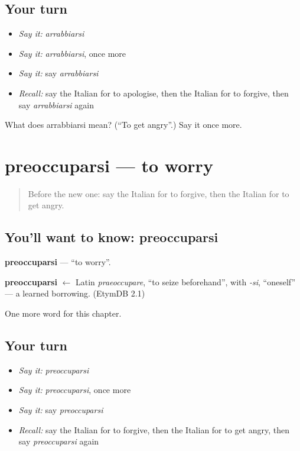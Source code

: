 \subsection*{Your turn}
\begin{itemize}
\raggedright
  \item \emph{Say it:} \emph{arrabbiarsi}
  \item \emph{Say it:} \emph{arrabbiarsi}, once more
  \item \emph{Say it:} say \emph{arrabbiarsi}
  \item \emph{Recall:} say the Italian for to apologise, then the Italian for to forgive, then say \emph{arrabbiarsi} again
\end{itemize}

\begin{tcolorbox}[breakable,colback=teal!4,colframe=teal!35!black,title={Before you move on}]
What does arrabbiarsi mean? (\textquotedblleft{}To get angry\textquotedblright{}.) Say it once more.
\end{tcolorbox}
\section[preoccuparsi]{preoccuparsi — to worry}

\label{lesson:IT-C144-preoccuparsi}



\begin{quote}
Before the new one: say the Italian for to forgive, then the Italian for to get angry.
\end{quote}

\subsection*{You'll want to know: preoccuparsi}
\textbf{preoccuparsi} — \textquotedblleft{}to worry\textquotedblright{}.

\begin{cousinweb}
\textbf{preoccuparsi} $\leftarrow$ Latin \emph{praeoccupare}, \textquotedblleft{}to seize beforehand\textquotedblright{}, with \emph{-si}, \textquotedblleft{}oneself\textquotedblright{} — a learned borrowing. (EtymDB 2.1)
\end{cousinweb}

\begin{grammarlens}[title={What you've built}]
One more word for this chapter.
\end{grammarlens}

\subsection*{Your turn}
\begin{itemize}
\raggedright
  \item \emph{Say it:} \emph{preoccuparsi}
  \item \emph{Say it:} \emph{preoccuparsi}, once more
  \item \emph{Say it:} say \emph{preoccuparsi}
  \item \emph{Recall:} say the Italian for to forgive, then the Italian for to get angry, then say \emph{preoccuparsi} again
\end{itemize}

